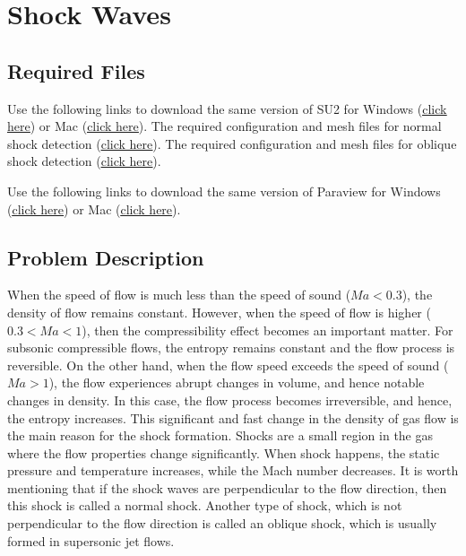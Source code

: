 \chapter{Shock Waves}
\label{ch:Shock Waves}
\section*{Required Files}
\begin{su2note}
	Use the following links to download the same version of SU2 for Windows (\href{https://users.encs.concordia.ca/~bvermeir/book/executables/windows/SU2_Windows.zip}{\underline{click here}}) or Mac (\href{https://users.encs.concordia.ca/~bvermeir/book/executables/osx/SU2_Mac.zip}{\underline{click here}}).
	The required configuration and mesh files for normal shock detection (\href{https://gitlab.com/bvermeir/book-cfd/blob/master/tutorial/tut7_shock_wave/normal_shock.zip}{\underline{click here}}).
	The required configuration and mesh files for oblique shock detection (\href{https://gitlab.com/bvermeir/book-cfd/blob/master/tutorial/tut7_shock_wave/oblique_shock.zip}{\underline{click here}}).	
\end{su2note}
\begin{paraviewnote}
	Use the following links to download the same version of Paraview for Windows (\href{https://users.encs.concordia.ca/~bvermeir/book/executables/windows/ParaView-5.4.0-Qt5-OpenGL2-Windows-64bit.exe}{\underline{click here}}) or Mac (\href{https://users.encs.concordia.ca/~bvermeir/book/executables/osx/ParaView-5.4.0-Qt5-OpenGL2-MPI-OSX10.8-64bit.dmg}{\underline{click here}}).
\end{paraviewnote}


\section*{Problem Description}
When the speed of flow is much less than the speed of sound ($Ma<0.3$), the density of flow remains constant. However, when the speed of flow is higher ($0.3<Ma<1$), then the compressibility effect becomes an important matter. For subsonic compressible flows, the entropy remains constant and the flow process is reversible. On the other hand, when the flow speed exceeds the speed of sound ($Ma>1$), the flow experiences abrupt changes in volume, and hence notable changes in density. In this case, the flow process becomes irreversible, and hence, the entropy increases. This significant and fast change in the density of gas flow is the main reason for the shock formation. Shocks are a small region in the gas where the flow properties change significantly. When shock happens, the static pressure and temperature increases, while the Mach number decreases. It is worth mentioning that if the shock waves are perpendicular to the flow direction, then this shock is called a normal shock. Another type of shock, which is not perpendicular to the flow direction is called an oblique shock, which is usually formed in supersonic jet flows.

